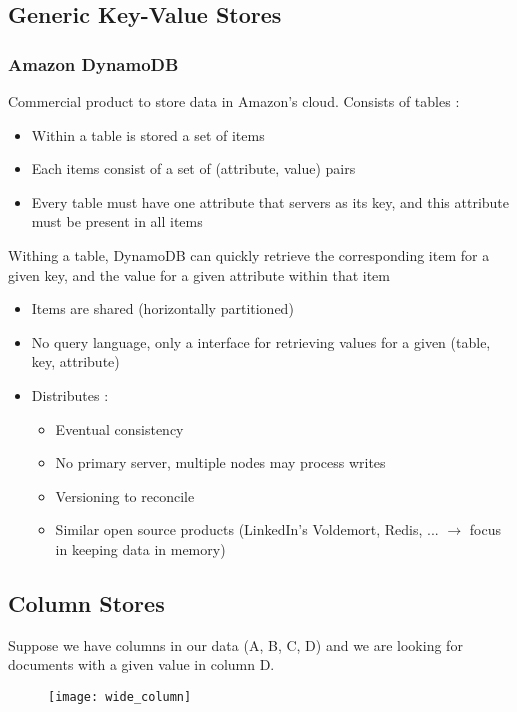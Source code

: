 \subsection{Generic Key-Value Stores}

\subsubsection{Amazon DynamoDB}

Commercial product to store data in Amazon's cloud. Consists of tables :
\begin{itemize}
    \item Within a table is stored a set of items
    \item Each items consist of a set of (attribute, value) pairs
    \item Every table must have one attribute that servers as its key, and this attribute must be present in all items
\end{itemize}

\newpage
Withing a table, DynamoDB can quickly retrieve the corresponding item for a given key, and the value for a given attribute within that item
\begin{itemize}
    \item Items are shared (horizontally partitioned)
    \item No query language, only a interface for retrieving values for a given (table, key, attribute)
    \item Distributes :
    \begin{itemize}
        \item Eventual consistency
        \item No primary server, multiple nodes may process writes
        \item Versioning to reconcile
        \item Similar open source products (LinkedIn's Voldemort, Redis, ... $\rightarrow$ focus in keeping data in memory)
    \end{itemize}
\end{itemize}

\subsection{Column Stores}

Suppose we have columns in our data (A, B, C, D) and we are looking for documents with a given value in column D.

\begin{figure}[H]
    \centering
    \texttt{[image: wide\_column]}
\end{figure}

